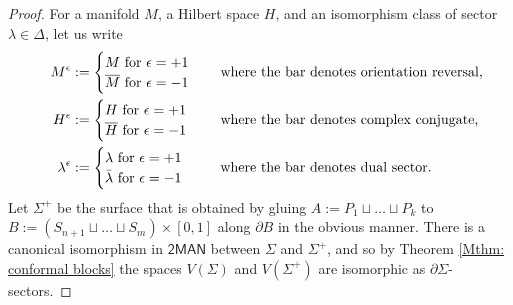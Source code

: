 \documentclass[a4paper,10pt,leqno]{amsart}
\theoremstyle{plain}
\theoremstyle{definition}
\theoremstyle{remark}
\begin{document}
\begin{proof}
For a manifold $M$, a Hilbert space $H$, and an isomorphism class of sector $\lambda\in \Delta$, let us write
\[
\begin{split}
\quad M^\epsilon&:=\begin{cases} M\text{ for }\epsilon=+1\\ \overline M\text{ for }\epsilon=-1\end{cases}\quad\text{where the bar denotes orientation reversal,}\\
H^\epsilon&:=\begin{cases} H\text{ for }\epsilon=+1\\ \overline H\text{ for }\epsilon=-1\end{cases}\,\quad\text{where the bar denotes complex conjugate,}\\
\lambda^\epsilon&:=\begin{cases} \lambda\text{ for }\epsilon=+1\\ \bar \lambda\text{ for }\epsilon=-1\end{cases}\hspace{.172cm}\quad\text{where the bar denotes dual sector.}
\end{split}
\]
Let $\Sigma^+$ be the surface that is obtained by gluing $A:=P_1\sqcup\ldots\sqcup P_k$ to $B:=(S_{n+1}\sqcup\ldots\sqcup S_m)\times [0,1]$ along $\partial B$ in the obvious manner.
There is a canonical isomorphism in $\mathsf{2MAN}$ between $\Sigma$ and $\Sigma^+$, and so by Theorem \ref{Mthm: conformal blocks}
the spaces $V(\Sigma)$ and $V(\Sigma^+)$ are isomorphic as $\partial\Sigma$-sectors.


\end{proof}
\end{document}
